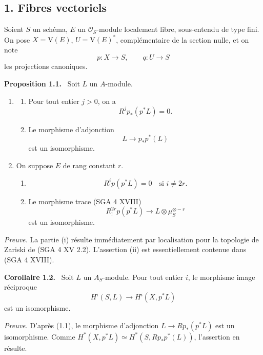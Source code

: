 \documentclass[11pt]{article}
\newenvironment{statement}[1]{\par\medskip\noindent\textbf{#1.}\ }{\par\medskip}
\providecommand{\V}{\mathrm V}
\begin{document}
\subsection*{1. Fibres vectoriels}

Soient $S$ un schéma, $E$ un $\mathcal O_S$-module localement libre, sous-entendu de type fini. On pose $X=\V(E)$, $U=\V(E)^*$, complémentaire de la section nulle, et on note
\[
p:X\to S,
\qquad
q:U\to S
\]
les projections canoniques.

\begin{statement}{Proposition 1.1}
Soit $L$ un $A$-module.
\begin{enumerate}[label=(\roman*)]
\item
\begin{enumerate}[label=\alph*)]
\item Pour tout entier $j>0$, on a
\[
R^j p_*(p^*L)=0.
\]
\item Le morphisme d'adjonction
\[
L\longrightarrow p_*p^*(L)
\]
est un isomorphisme.
\end{enumerate}
\item On suppose $E$ de rang constant $r$.
\begin{enumerate}[label=\alph*)]
\item
\[
R_!^i p(p^*L)=0\quad\text{si }i\ne 2r.
\]
\item Le morphisme trace (SGA 4 XVIII)
\[
R_!^{2r}p(p^*L)\longrightarrow L\otimes\mu_S^{\otimes -r}
\]
est un isomorphisme.
\end{enumerate}
\end{enumerate}
\end{statement}

\emph{Preuve.} La partie (i) résulte immédiatement par localisation pour la topologie de Zariski de (SGA 4 XV 2.2). L'assertion (ii) est essentiellement contenue dans (SGA 4 XVIII).

\begin{statement}{Corollaire 1.2}
Soit $L$ un $A_S$-module. Pour tout entier $i$, le morphisme image réciproque
\[
H^i(S,L)\longrightarrow H^i(X,p^*L)
\]
est un isomorphisme.
\end{statement}

\emph{Preuve.} D'après (1.1), le morphisme d'adjonction $L\to Rp_*(p^*L)$ est un isomorphisme. Comme $H^*(X,p^*L)\simeq H^*(S,Rp_*p^*(L))$, l'assertion en résulte.
\end{document}
